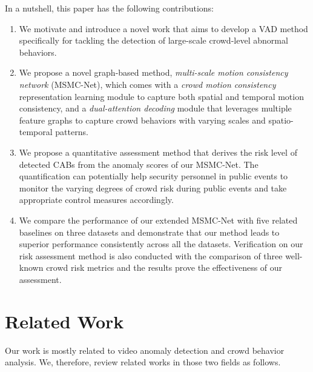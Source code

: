 \documentclass[journal]{IEEEtran}
\begin{document}
In a nutshell, this paper has the following contributions:
\begin{enumerate}[label=(\roman*)]%
\item We motivate and introduce a novel work that aims to develop a VAD method specifically for tackling the detection of large-scale crowd-level abnormal behaviors.
\item We propose a novel graph-based method, \emph{multi-scale motion consistency network} (MSMC-Net), which comes with a \emph{crowd motion consistency} representation learning module to capture both spatial and temporal motion consistency, and a \textit{dual-attention decoding} module that leverages multiple feature graphs to capture crowd behaviors with varying scales and spatio-temporal patterns. 
\item We propose a quantitative assessment method that derives the risk level of detected CABs from the anomaly scores of our MSMC-Net. The quantification can potentially help security personnel in public events to monitor the varying degrees of crowd risk during public events and take appropriate control measures accordingly.
\item We compare the performance of our extended MSMC-Net with five related baselines on three datasets and demonstrate that our method leads to superior performance consistently across all the datasets. Verification on our risk assessment method is also conducted with the comparison of three well-known crowd risk metrics and the results prove the effectiveness of our assessment.
\end{enumerate}

\section{Related Work}
Our work is mostly related to video anomaly detection and crowd behavior analysis. We, therefore, review related works in those two fields as follows.
\end{document}
